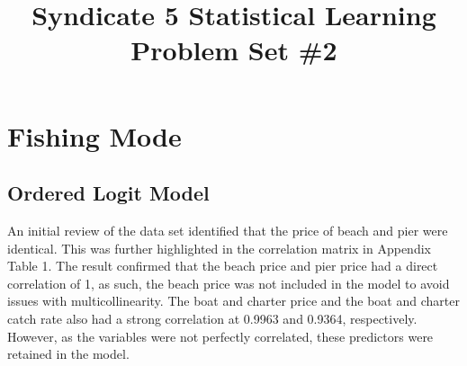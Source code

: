 \documentclass[12pt]{article}
\begin{document}
\title{Syndicate 5 Statistical Learning Problem Set \#2}
\maketitle
{\setlength{\parindent}{0cm}

\section*{Fishing Mode}
\subsection*{Ordered Logit Model}
An initial review of the data set identified that the price of beach and pier were identical. This was further highlighted in the correlation matrix in Appendix Table 1. The result confirmed that the beach price and pier price had a direct correlation of 1, as such, the beach price was not included in the model to avoid issues with multicollinearity. The boat and charter price and the boat and charter catch rate also had a strong correlation at 0.9963 and 0.9364, respectively. However, as the variables were not perfectly correlated, these predictors were retained in the model.\\

\begin{table}[!htbp] \centering 
  \caption{Correlation Matrix} 
  \label{} 
\end{table} 

}
\end{document}
